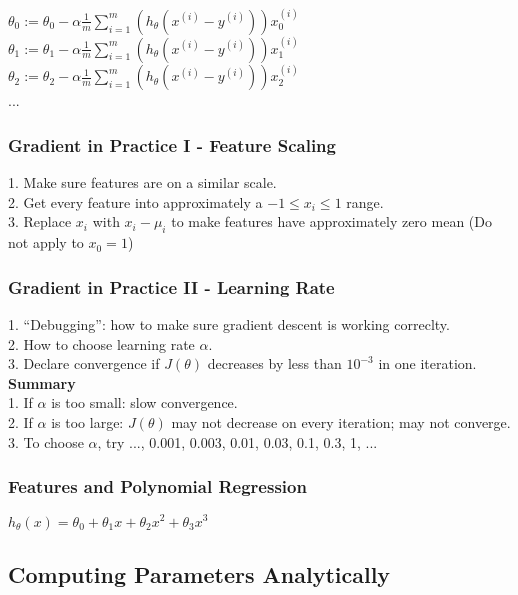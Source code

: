 \documentclass{article}
\begin{document}
$\theta_0 := \theta_0 - \alpha \frac{1}{m} \sum_{i=1}^{m}(h_\theta(x^{(i)} - y^{(i)})) x_{0}^{(i)}$ \\
$\theta_1 := \theta_1 - \alpha \frac{1}{m} \sum_{i=1}^{m}(h_\theta(x^{(i)} - y^{(i)})) x_{1}^{(i)}$ \\
$\theta_2 := \theta_2 - \alpha \frac{1}{m} \sum_{i=1}^{m}(h_\theta(x^{(i)} - y^{(i)})) x_{2}^{(i)}$ \\
...

\subsubsection{Gradient in Practice I - Feature Scaling}
1. Make sure features are on a similar scale. \\
2. Get every feature into approximately a $-1 \le x_i \le 1$ range. \\
3. Replace $x_i$ with $x_i - \mu_i$ to make features have approximately zero mean (Do not apply to $x_0 = 1$)

\subsubsection{Gradient in Practice II - Learning Rate}
1. ``Debugging'': how to make sure gradient descent is working correclty. \\
2. How to choose learning rate $\alpha$. \\
3. Declare convergence if $J(\theta)$ decreases by less than $10^{-3}$ in one iteration. \\

\textbf{Summary}\\
1. If $\alpha$ is too small: slow convergence. \\
2. If $\alpha$ is too large: $J(\theta)$ may not decrease on every iteration; may not converge. \\
3. To choose $\alpha$, try ..., 0.001, 0.003, 0.01, 0.03, 0.1, 0.3, 1, ... 

\subsubsection{Features and Polynomial Regression}
$h_\theta(x) = \theta_0 + \theta_1 x + \theta_2 x^2 + \theta_3 x^3$ \\

\newpage

\subsection{Computing Parameters Analytically}
\end{document}

